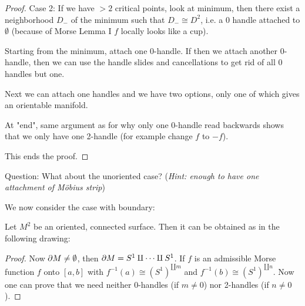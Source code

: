 \begin{proof}
    \noindent Case 2: If we have $>2$ critical points, look at minimum, then there exist a neighborhood $D_-$ of the minimum such that $D_- \cong D^2$, i.e. a 0 handle attached to $\emptyset$ (because of Morse Lemma I $f$ locally looks like a cup).

    \noindent Starting from the minimum, attach one 0-handle. If then we attach another 0-handle, then we can use the handle slides and cancellations to get rid of all 0 handles but one.

    \noindent Next we can attach one handles and we have two options, %
    only one of which gives an orientable manifold.

    \noindent At "end", same argument as for why only one 0-handle read backwards shows that we only have one 2-handle (for example change $f$ to $-f$).

    \noindent This ends the proof.
\end{proof}

Question: What about the unoriented case? (\textit{Hint: enough to have one attachment of Möbius strip})

We now consider the case with boundary:
\begin{thm}
    Let $M^2$ be an oriented, connected surface. Then it can be obtained as in the following drawing:
\end{thm}
\begin{proof}
    Now $ \partial M \neq \emptyset$, then $\partial M = S^1 \amalg \dots \amalg S^1$. If $f$ is an admissible Morse function $f$ onto $[a,b]$ with $f^{-1}(a) \cong (S^1)^{\amalg m}$ and $f^{-1}(b) \cong (S^1)^{\amalg n}$. Now one can prove that we need neither 0-handles (if $m \neq 0$) nor 2-handles (if $n \neq 0$).
\end{proof}